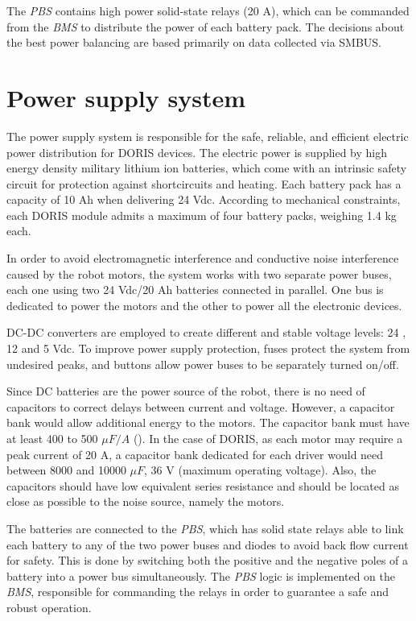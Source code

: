 \documentclass{ifacconf}
\begin{document}
The \emph{PBS} contains high power solid-state relays (20 A), which can be
commanded from the \emph{BMS} to distribute the power of each battery pack.
The decisions about the best power balancing are based primarily on data
collected via SMBUS.

\section{Power supply system}\label{sec:powersupply_overview}
The power supply system is responsible for the safe, reliable, and efficient
electric power distribution for DORIS devices. The electric power is supplied by
high energy density military lithium ion batteries, which come with an intrinsic
safety circuit for protection against shortcircuits and heating. Each battery
pack has a capacity of 10 Ah when delivering 24 Vdc. According to mechanical
constraints, each DORIS module admits a maximum of four battery packs, weighing
1.4 kg each.

In order to avoid electromagnetic interference and conductive noise interference
caused by the robot motors, the system works with two separate power buses, each
one using two 24 Vdc/20 Ah batteries connected in parallel. One bus is
dedicated to power the motors and the other to power all the electronic
devices.

DC-DC converters are employed to create different and stable voltage levels: 24
, 12 and 5 Vdc. To improve power supply protection, fuses protect the system
from undesired peaks, and buttons allow power buses to be separately turned on/off.

Since DC batteries are the power source of the robot, there is no need of
capacitors to correct delays between current and voltage. However, a capacitor
bank would allow additional energy to the motors. The capacitor bank must have
at least 400 to 500  $\mu F/A$ (\cite{capacitor}). In the case of DORIS, as each
motor may require a peak current of 20 A, a capacitor bank dedicated for each
driver would need between 8000 and 10000 $\mu F$, 36 V (maximum operating
voltage). Also, the capacitors should have low equivalent series resistance and
should be located as close as possible to the noise source, namely the
motors. 

The batteries are connected to the \emph{PBS}, which has solid state relays
able to link each battery to any of the two power buses and diodes to avoid back
flow current for safety. This is done by switching both the positive and the
negative poles of a battery into a power bus simultaneously. The \emph{PBS}
logic is implemented on the \emph{BMS}, responsible for commanding the
relays in order to guarantee a safe and robust operation.
\end{document}
